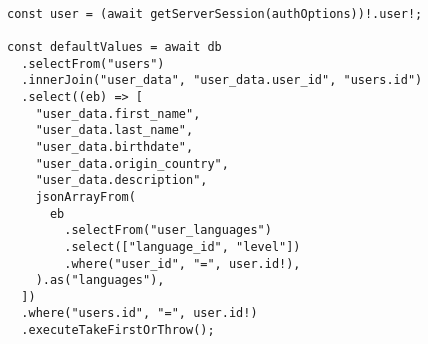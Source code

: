 \begin{verbatim}

const user = (await getServerSession(authOptions))!.user!;

const defaultValues = await db
  .selectFrom("users")
  .innerJoin("user_data", "user_data.user_id", "users.id")
  .select((eb) => [
    "user_data.first_name",
    "user_data.last_name",
    "user_data.birthdate",
    "user_data.origin_country",
    "user_data.description",
    jsonArrayFrom(
      eb
        .selectFrom("user_languages")
        .select(["language_id", "level"])
        .where("user_id", "=", user.id!),
    ).as("languages"),
  ])
  .where("users.id", "=", user.id!)
  .executeTakeFirstOrThrow();
\end{verbatim}